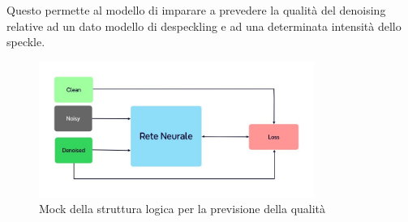 Questo permette al modello di imparare a 
prevedere la qualità del denoising relative ad un dato modello di despeckling e ad una determinata intensità dello speckle. 
\begin{figure}[H]
    \centering
    \includegraphics[width=0.8\textwidth]{utils/Architettura_rete_neurale.jpg}
    \caption{Mock della struttura logica per la previsione della qualità}
    \label{fig:MockReteNeurale}
\end{figure}

